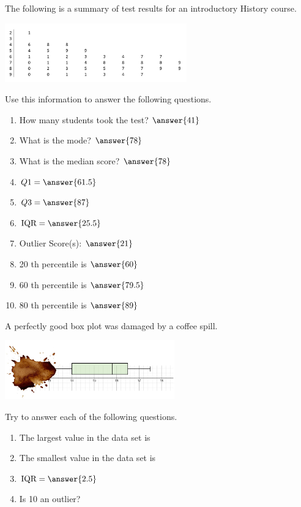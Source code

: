 \documentclass{ximera}
\begin{document}
\begin{problem}\label{prob:140hom2prob4}
The following is a summary of test results for an introductory History course.
\begin{image}
   \includegraphics[height=1in]{140H2pic10.jpg}
 \end{image}
 
 Use this information to answer the following questions.
 
 \begin{enumerate}
     \item How many students took the test? $\answer{41}$
     \item What is the mode? $\answer{78}$
     \item What is the median score? $\answer{78}$
     \item $Q1=\answer{61.5}$
     \item $Q3=\answer{87}$
     \item $\mbox{IQR}=\answer{25.5}$
     \item Outlier Score(s): $\answer{21}$
     \item 20 th percentile is $\answer{60}$
     \item 60 th percentile is $\answer{79.5}$
     \item 80 th percentile is $\answer{89}$
 \end{enumerate}
\end{problem}

\begin{problem}\label{prob:140hom2prob5}
A perfectly good box plot was damaged by a coffee spill.  
\begin{image}
   \includegraphics[height=1in]{140H2pic9.jpg}
 \end{image}
 Try to answer each of the following questions.
 \begin{enumerate}
     \item The largest value in the data set is 
     \item The smallest value in the data set is 
     \item $\mbox{IQR}=\answer{2.5}$
     \item Is 10 an outlier? 
 \end{enumerate}
 
 \end{problem}
 
\end{document}

